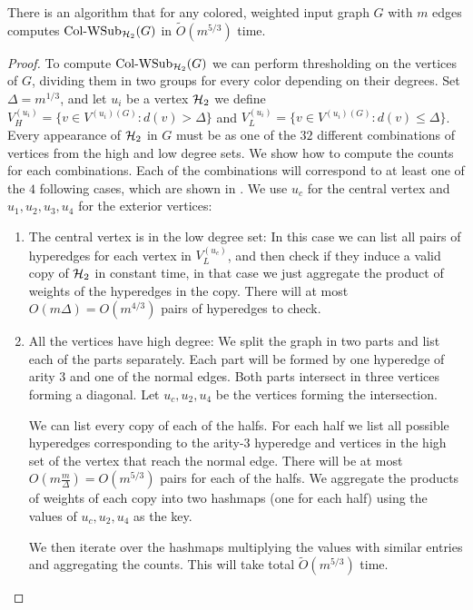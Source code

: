 \documentclass[a4paper,UKenglish,cleveref, autoref, numberwithinsect, thm-restate]{lipics-v2021}
\newcommand{\hypertwo}{\cH_2}
\newcommand{\WSub}[2]{\mathrm{\text{Col-WSub}}_{#2}(#1)}
\newcommand{\cH}{{\cal H}}
\begin{document}
	\begin{lemma} \label{lem:hypertwo}
		There is an algorithm that for any colored, weighted input graph $G$ with $m$ edges computes $\WSub{G}{\hypertwo}$ in $\tilde{O}(m^{5/3})$ time.
	\end{lemma}
	\begin{proof}
		To compute $\WSub{G}{\hypertwo}$ we can perform thresholding on the vertices of $G$, dividing them in two groups for every color depending on their degrees. Set $\Delta = m^{1/3}$, and let $u_i$ be a vertex $\hypertwo$ we define $V^{(u_i)}_H = \{v \in V^{(u_i)(G)}: d(v) > \Delta\}$ and $V^{(u_i)}_L = \{v \in V^{(u_i)(G)}: d(v) \leq \Delta\}$. Every appearance of $\hypertwo$ in $G$ must be as one of the $32$ different combinations of vertices from the high and low degree sets. We show how to compute the counts for each combinations. Each of the combinations will correspond to at least one of the $4$ following cases, which are shown in . We use $u_c$ for the central vertex and $u_1,u_2,u_3,u_4$ for the exterior vertices:
		\begin{enumerate}
			\item The central vertex is in the low degree set: In this case we can list all pairs of hyperedges for each vertex in $V^{(u_c)}_L$, and then check if they induce a valid copy of $\hypertwo$ in constant time, in that case we just aggregate the product of weights of the hyperedges in the copy. There will at most $ O(m\Delta) = O(m^{4/3})$ pairs of hyperedges to check.
			
			\item All the vertices have high degree: We split the graph in two parts and list each of the parts separately. Each part will be formed by one hyperedge of arity $3$ and one of the normal edges. Both parts intersect in three vertices forming a diagonal. Let $u_c,u_2,u_4$ be the vertices forming the intersection.
			
			We can list every copy of each of the halfs. For each half we list all possible hyperedges corresponding to the arity-$3$ hyperedge and vertices in the high set of the vertex that reach the normal edge. There will be at most $O(m\frac{m}{\Delta}) = O(m^{5/3})$ pairs for each of the halfs. We aggregate the products of weights of each copy into two hashmaps (one for each half) using the values of $u_c,u_2,u_4$ as the key.
			
			We then iterate over the hashmaps multiplying the values with similar entries and aggregating the counts. This will take total $\tilde{O}(m^{5/3})$ time. 
			

\end{enumerate}
\end{proof}
\end{document}
